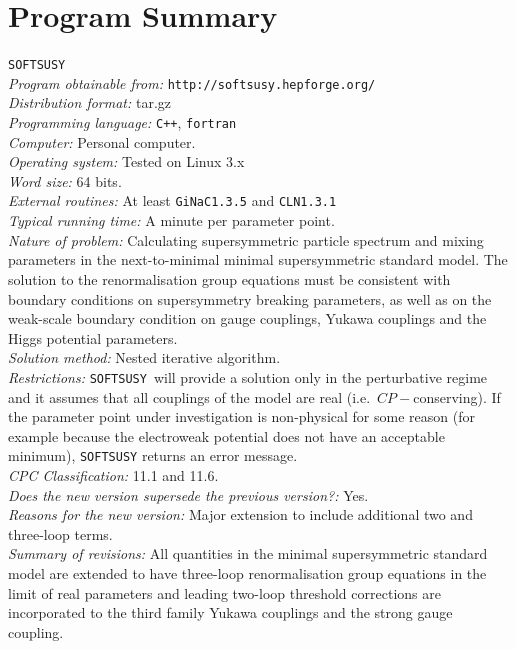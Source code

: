 \documentclass[final,3p,times,pdflatex]{elsarticle}
\def\SOFTSUSY{{\tt SOFTSUSY}}
\begin{document}
\section{Program Summary}
 \SOFTSUSY{}\\
{\em Program obtainable   from:} {\tt http://softsusy.hepforge.org/}\\
{\em Distribution format:}\/ tar.gz\\
{\em Programming language:} {\tt C++}, {\tt fortran}\\
{\em Computer:}\/ Personal computer.\\
{\em Operating system:}\/ Tested on Linux 3.x\\
{\em Word size:}\/ 64 bits.\\
{\em External routines:}\/ At least {\tt GiNaC1.3.5} and {\tt CLN1.3.1}\\
{\em Typical running time:}\/ A minute per parameter point.\\
{\em Nature of problem:}\/ Calculating supersymmetric particle spectrum and
mixing parameters in the next-to-minimal minimal supersymmetric standard
model. The solution to the renormalisation group equations must be consistent
with boundary conditions on supersymmetry breaking parameters, as
well as on the weak-scale boundary condition on gauge 
couplings, Yukawa couplings and the Higgs potential parameters.\\
{\em Solution method:}\/ Nested iterative algorithm. \\
{\em Restrictions:} \SOFTSUSY~will provide a solution only in the
perturbative regime and it
assumes that all couplings of the model are real
(i.e.\ $CP-$conserving). If the parameter point under investigation is
non-physical for some reason (for example because the electroweak potential
does not have an acceptable minimum), \SOFTSUSY{} returns an error message.\\
{\em CPC Classification:} 11.1 and 11.6.\\
{\em Does the new version supersede the previous version?:} Yes.\\
{\em Reasons for the new version:} Major extension to include additional two
and three-loop terms.\\
{\em Summary of revisions:} 
All quantities in the minimal supersymmetric standard model are extended to
have three-loop renormalisation group equations in the limit of real
parameters and leading two-loop threshold
corrections are incorporated to the third family Yukawa couplings and the
strong gauge coupling. 
\newpage
\end{document}
